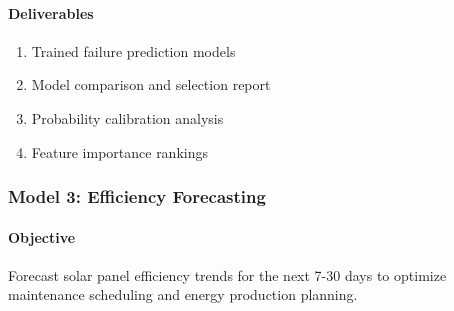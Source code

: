 \documentclass[12pt,a4paper]{article}
\begin{document}
\paragraph{Deliverables}
\begin{enumerate}
    \item Trained failure prediction models
    \item Model comparison and selection report
    \item Probability calibration analysis
    \item Feature importance rankings
\end{enumerate}

\subsubsection{Model 3: Efficiency Forecasting}

\paragraph{Objective}
Forecast solar panel efficiency trends for the next 7-30 days to optimize maintenance scheduling and energy production planning.
\end{document}
